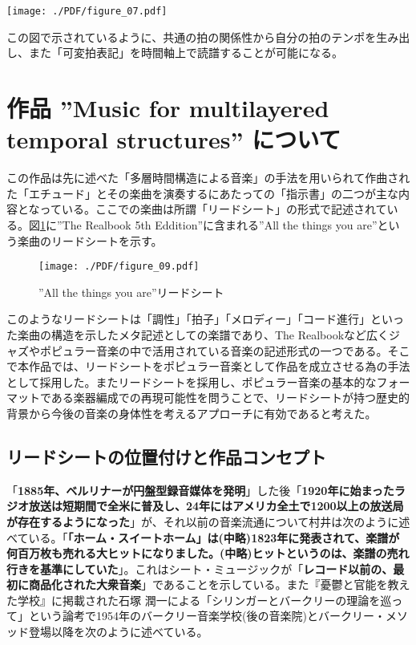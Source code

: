 \documentclass[uplatex,dvipdfmx]{ujarticle}
\begin{document}
\begin{figure*}[htb]
\centerline{
	\texttt{[image: ./PDF/figure\_07.pdf]}
}
\caption{''Etude ＃2'' 「打点の取りかたについて」}
\label{fig:figure_07}
\end{figure*}

この図で示されているように、共通の拍の関係性から自分の拍のテンポを生み出し、また「可変拍表記」を時間軸上で読譜することが可能になる。

\afterpage{\clearpage}
\newpage

\section{作品 ''Music for multilayered temporal structures'' について}

この作品は先に述べた「多層時間構造による音楽」の手法を用いられて作曲された「エチュード」とその楽曲を演奏するにあたっての「指示書」の二つが主な内容となっている。ここでの楽曲は所謂「リードシート」の形式で記述されている。図\ref{fig:figure_09}に''The Realbook 5th Eddition''に含まれる''All the things you are''という楽曲のリードシートを示す。

\begin{figure}[H]
\centerline{
	\texttt{[image: ./PDF/figure\_09.pdf]}
}
\caption{''All the things you are''リードシート}
\label{fig:figure_09}
\end{figure}

このようなリードシートは「調性」「拍子」「メロディー」「コード進行」といった楽曲の構造を示したメタ記述としての楽譜であり、The Realbookなど広くジャズやポピュラー音楽の中で活用されている音楽の記述形式の一つである。そこで本作品では、リードシートをポピュラー音楽として作品を成立させる為の手法として採用した。またリードシートを採用し、ポピュラー音楽の基本的なフォーマットである楽器編成での再現可能性を問うことで、リードシートが持つ歴史的背景から今後の音楽の身体性を考えるアプローチに有効であると考えた。

\subsection{リードシートの位置付けと作品コンセプト}

「{\bf 1885年、ベルリナーが円盤型録音媒体を発明}」\cite{murai:01}した後「{\bf 1920年に始まったラジオ放送は短期間で全米に普及し、24年にはアメリカ全土で1200以上の放送局が存在するようになった}」\cite{murai:01}が、それ以前の音楽流通について村井は次のように述べている。「{\bf 「ホーム・スイートホーム」は(中略)1823年に発表されて、楽譜が何百万枚も売れる大ヒットになりました。(中略)ヒットというのは、楽譜の売れ行きを基準にしていた}」\cite{murai:01}。これはシート・ミュージックが「{\bf レコード以前の、最初に商品化された大衆音楽}」\cite{kikuchi-ootani:01}であることを示している。また『憂鬱と官能を教えた学校』に掲載された石塚 潤一による「シリンガーとバークリーの理論を巡って」という論考で1954年のバークリー音楽学校(後の音楽院)とバークリー・メソッド登場以降を次のように述べている。\\
\end{document}
